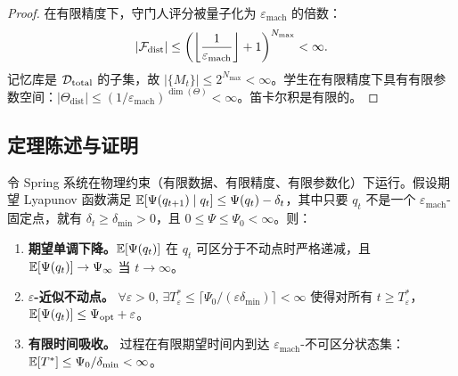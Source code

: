 \begin{proof}
在有限精度下，守门人评分被量子化为 $\varepsilon_{\text{mach}}$ 的倍数：
\begin{equation}
    |\mathcal{F}_{\text{dist}}| \leq \left(\left\lfloor \frac{1}{\varepsilon_{\text{mach}}} \right\rfloor + 1\right)^{N_{\max}} < \infty.
\end{equation}
记忆库是 $\mathcal{D}_{\text{total}}$ 的子集，故 $|\{M_t\}| \leq 2^{N_{\max}} < \infty$。学生在有限精度下具有有限参数空间：$|\Theta_{\text{dist}}| \leq (1/\varepsilon_{\text{mach}})^{\dim(\Theta)} < \infty$。笛卡尔积是有限的。
\end{proof}

\subsection{定理陈述与证明}

\begin{theorem}\label{thm:spring2}
令 Spring 系统在物理约束（有限数据、有限精度、有限参数化）下运行。假设期望 Lyapunov 函数满足 $\mathbb{E}[\Psi(q_{t+1}) \mid q_t] \leq \Psi(q_t) - \delta_t$，其中只要 $q_t$ 不是一个 $\varepsilon_{\text{mach}}$-固定点，就有 $\delta_t \geq \delta_{\min} > 0$，且 $0 \leq \Psi \leq \Psi_0 < \infty$。则：
\begin{enumerate}[label=(\alph*), nosep]
    \item \textbf{期望单调下降。}$\mathbb{E}[\Psi(q_t)]$ 在 $q_t$ 可区分于不动点时严格递减，且 $\mathbb{E}[\Psi(q_t)] \to \Psi_\infty$ 当 $t \to \infty$。
    \item \textbf{$\varepsilon$-近似不动点。} $\forall \varepsilon > 0$, $\exists T_\varepsilon^* \leq \lceil \Psi_0 / (\varepsilon \delta_{\min}) \rceil < \infty$ 使得对所有 $t \geq T_\varepsilon^*$，$\mathbb{E}[\Psi(q_t)] \leq \Psi_{\text{opt}} + \varepsilon$。
    \item \textbf{有限时间吸收。} 过程在有限期望时间内到达 $\varepsilon_{\text{mach}}$-不可区分状态集：$\mathbb{E}[T^*] \leq \Psi_0 / \delta_{\min} < \infty$。
\end{enumerate}
\end{theorem}

